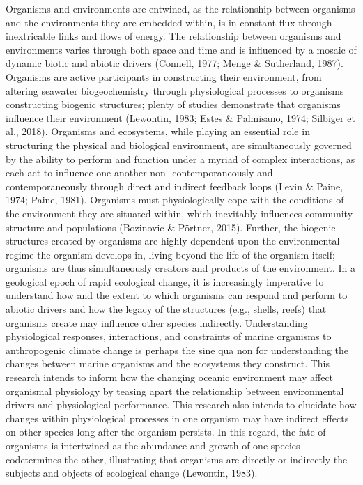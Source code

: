 \documentclass[
  11pt,
]{article}
\begin{document}
\begin{centering}
Organisms and environments are entwined, as the relationship between
organisms and the environments they are embedded within, is in constant
flux through inextricable links and flows of energy. The relationship
between organisms and environments varies through both space and time
and is influenced by a mosaic of dynamic biotic and abiotic drivers
(Connell, 1977; Menge \& Sutherland, 1987). Organisms are active
participants in constructing their environment, from altering seawater
biogeochemistry through physiological processes to organisms
constructing biogenic structures; plenty of studies demonstrate that
organisms influence their environment (Lewontin, 1983; Estes \&
Palmisano, 1974; Silbiger et al., 2018). Organisms and ecosystems, while
playing an essential role in structuring the physical and biological
environment, are simultaneously governed by the ability to perform and
function under a myriad of complex interactions, as each act to
influence one another non- contemporaneously and contemporaneously
through direct and indirect feedback loops (Levin \& Paine, 1974; Paine,
1981). Organisms must physiologically cope with the conditions of the
environment they are situated within, which inevitably influences
community structure and populations (Bozinovic \& Pörtner, 2015).
Further, the biogenic structures created by organisms are highly
dependent upon the environmental regime the organism develops in, living
beyond the life of the organism itself; organisms are thus
simultaneously creators and products of the environment. In a geological
epoch of rapid ecological change, it is increasingly imperative to
understand how and the extent to which organisms can respond and perform
to abiotic drivers and how the legacy of the structures (e.g., shells,
reefs) that organisms create may influence other species indirectly.
Understanding physiological responses, interactions, and constraints of
marine organisms to anthropogenic climate change is perhaps the sine qua
non for understanding the changes between marine organisms and the
ecosystems they construct. This research intends to inform how the
changing oceanic environment may affect organismal physiology by teasing
apart the relationship between environmental drivers and physiological
performance. This research also intends to elucidate how changes within
physiological processes in one organism may have indirect effects on
other species long after the organism persists. In this regard, the fate
of organisms is intertwined as the abundance and growth of one species
codetermines the other, illustrating that organisms are directly or
indirectly the subjects and objects of ecological change (Lewontin,
1983).


\end{centering}
\end{document}
